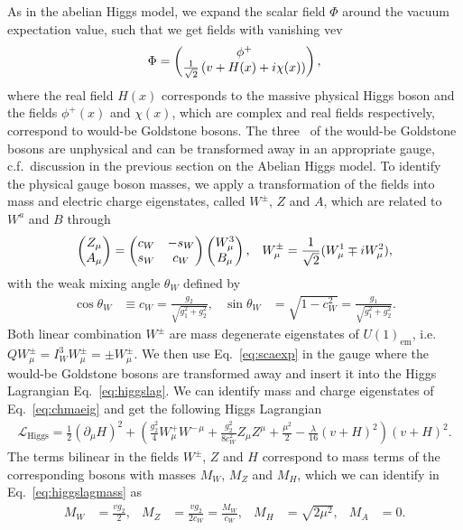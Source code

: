 As in the abelian Higgs model, we expand the scalar field $\Phi$ around the vacuum expectation
value, such that we get fields with vanishing vev
\begin{align}\label{eq:scaexp}
\Phi=\pmqty{\phi^+\\\frac{1}{\sqrt{2}}\left(v+H(x)+i\chi(x)\right)},
\end{align}
where the real field $H(x)$ corresponds to the massive physical Higgs
boson and the fields $\phi^+(x)$ and $\chi(x)$, which are complex and
real fields respectively, correspond to would-be Goldstone bosons. The three \dof~of the
would-be Goldstone bosons are unphysical and can be transformed away in an appropriate
gauge, c.f.~discussion in the previous section on the
Abelian Higgs model. To identify the physical gauge boson masses, we apply a transformation
of the fields into mass and electric charge eigenstates, called
$W^\pm$, $Z$ and $A$, which are related to $W^a$ and $B$ through
\begin{align}\label{eq:chmaeig}
  \pmqty{Z_\mu\\A_\mu}=\pmqty{c_W & -
    s_W\\s_W & c_W}\pmqty{W_\mu^3\\B_\mu}, && W_\mu^{\pm} =
  \frac{1}{\sqrt{2}}(W_\mu^1\mp i W_\mu^2),
\end{align}
with the weak mixing angle $\theta_W$ defined by
\begin{align}
  \cos\theta_W &\equiv c_W=\frac{g_2}{\sqrt{g_1^2+g_2^2}}, &   \sin\theta_W
  &=\sqrt{1-c_W^2}=\frac{g_1}{\sqrt{g_1^2+g_2^2}}.
\end{align}
Both linear combination $W^\pm$ are mass degenerate eigenstates of
$U(1)_{\text{em}}$, i.e.~$QW_\mu^\pm= I^3_W W_\mu^\pm = \pm
W^\pm_\mu$. We then use Eq.~\eqref{eq:scaexp} in the gauge where the would-be Goldstone bosons are transformed away and insert it into the Higgs
Lagrangian Eq.~\eqref{eq:higgslag}. We can identify mass and
charge eigenstates of Eq.~\eqref{eq:chmaeig} and get the following
Higgs Lagrangian
\begin{align}\label{eq:higgslagmass}
    \mathcal{L}_{\text{Higgs}} =\frac{1}{2}(\partial_\mu
    H)^2+ \left(\frac{g_2^2}{4}W^+_\mu W^{-\,\mu}+
      \frac{g_2^2}{8c_W^2}Z_\mu Z^{\mu}+\frac{\mu^2}{2}
      -\frac{\lambda}{16}(v+H)^2 \right) (v+H)^2.
\end{align}
The terms bilinear in the fields $W^\pm$, $Z$ and $H$ correspond to
mass terms of the corresponding bosons with masses $M_W$, $M_Z$ and
$M_H$, which we can identify in Eq.~\eqref{eq:higgslagmass} as
\begin{align}
  M_W &= \frac{vg_2}{2}, & M_Z &=\frac{ vg_2}{2c_W}=\frac{M_W}{c_W}, &M_H
  &=\sqrt{2\mu^2}, & M_A&=0.
\end{align}
